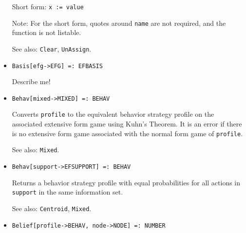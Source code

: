 \begin{itemize}
{\it for all types} {\tt T} 
\bd 
Creates a new variable \verb+name+, with return value of \verb+value+.
Returns the value assigned.  If \verb+name+ is already a defined
variable in the current scope, then if it is of type \verb+T+, it is
modified to have return value of \verb+value+.  If it is of a
different data type, an error results.
 
\item [Short form:] \verb+x := value+
\item [Note:] For the short form, quotes around \verb+name+ are not
required, and the function is not listable.
\item [See also:] \verb+Clear+, \verb+UnAssign+.
\ed


\item{}
\protect \large \begin{verbatim}
Basis[efg->EFG] =: EFBASIS
\end{verbatim}\normalsize

\bd
Describe me!
\ed

\item{}
\protect \large \begin{verbatim}
Behav[mixed->MIXED] =: BEHAV 
\end{verbatim}\normalsize

\bd
{}
Converts \verb+profile+ to the equivalent behavior strategy profile on the
associated extensive form game using Kuhn's Theorem.  It is an error
if there is no extensive form game associated with the normal form game
of \verb+profile+.
\item [See also:] \verb+Mixed+.
\ed

\item{}
\protect \large \begin{verbatim}
Behav[support->EFSUPPORT] =: BEHAV 
\end{verbatim}\normalsize

\bd
Returns a behavior strategy profile with equal
probabilities for all actions in \verb+support+ in the same information set. 
\item [See also:] \verb+Centroid+, \verb+Mixed+.
\ed

\item{}
\protect \large \begin{verbatim}
Belief[profile->BEHAV, node->NODE] =: NUMBER 
\end{verbatim}\normalsize


\end{itemize}
